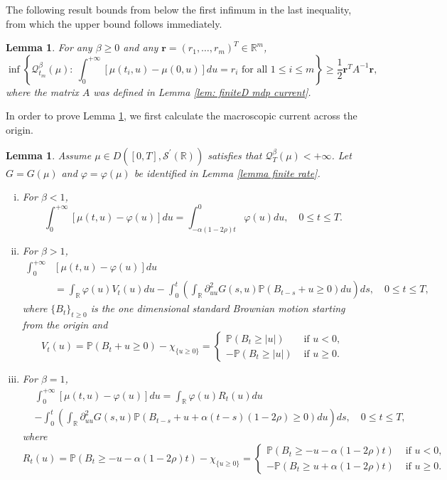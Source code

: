 \documentclass[reqno,11pt]{amsart}
\numberwithin{equation}{section}
\newtheorem{lemma}[theorem]{Lemma}
\newcommand{\R}{\mathbb{R}}
\newcommand{\Scal}{\mathcal{S}}
\begin{document}
The following result bounds from below the first infimum in the last inequality, from which the upper bound follows immediately.

\begin{lemma}\label{lemma contraction principle of current}
For any $\beta\geq 0$ and any $\mathbf{r}=(r_1,\ldots, r_m)^T\in \mathbb{R}^m$, 
\[
\inf\left\{\mathcal{Q}^\beta_{t_m} (\mu):~\int_0^{+\infty} [\mu(t_i,u)-\mu(0, u)] du=r_i\text{~for all~}1\leq i\leq m\right\}\geq \frac{1}{2} \mathbf{r}^T A^{-1} \mathbf{r},
\]
where the matrix $A$ was defined in Lemma \ref{lem: finiteD mdp current}.
\end{lemma}

In order to prove Lemma \ref{lemma contraction principle of current}, we first calculate the macroscopic current across the origin.

\begin{lemma}\label{lemma 5.3}
	Assume $\mu\in D ([0, T], \Scal^\prime(\R))$ satisfies that $\mathcal{Q}_{T}^\beta (\mu)<+\infty$.   Let  $G = G(\mu)$ and $\varphi = \varphi (\mu)$ be identified  in Lemma \ref{lemma finite rate}.
	\begin{enumerate}[(i)]
		\item For $\beta<1$,
		\[
		\int_0^{+\infty}[\mu(t,u)-\varphi (u)]du=\int_{-\alpha(1-2\rho)t}^0 \varphi (u) du, \quad 0\leq t\leq T.
		\]
		\item For $\beta>1$,
		\begin{align*}
			\int_0^{+\infty}&[\mu(t,u)-\varphi (u)]du\\
			&=\int_{\R}\varphi (u) V_t(u)du-\int_0^t\left(\int_{\R}\partial_{uu}^2G (s,u)\mathbb{P}(B_{t-s}+u\geq 0)du\right)ds, \quad 0 \leq t \leq T,
		\end{align*}
		where $\{B_t\}_{t\geq 0}$ is the one dimensional standard Brownian motion starting from the origin and 
		\[
		V_t(u)=\mathbb{P}(B_t+u\geq 0)-\chi_{\{u\geq 0\}}=
		\begin{cases}
			\mathbb{P}(B_t\geq |u|) & \text{~if~}u<0,\\
			-\mathbb{P}(B_t\geq |u|) & \text{~if~}u\geq 0. 
		\end{cases}
		\]
		\item For $\beta=1$,
		\begin{align*}
			&\int_0^{+\infty} [\mu(t,u)-\varphi (u)] du=\int_{\R}\varphi (u)R_t(u)du\\
			&-\int_0^t\left(\int_{\R}\partial_{uu}^2 G (s,u)\mathbb{P}(B_{t-s}+u+\alpha(t-s)(1-2\rho)\geq 0)du\right)ds, \quad 0 \leq t \leq T,
		\end{align*}
		where 
		\[
		R_t(u)=\mathbb{P}(B_t\geq -u-\alpha(1-2\rho)t)-\chi_{\{u\geq 0\}}=
		\begin{cases}
			\mathbb{P}(B_t\geq -u-\alpha(1-2\rho)t) & \text{~if~}u<0,\\
			-\mathbb{P}(B_t\geq u+\alpha(1-2\rho)t) & \text{~if~}u\geq 0. 
		\end{cases}
		\] 
	\end{enumerate}
\end{lemma}
\end{document}
